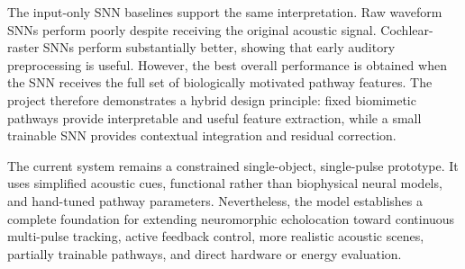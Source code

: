 The input-only SNN baselines support the same interpretation. Raw waveform SNNs perform poorly despite receiving the original acoustic signal. Cochlear-raster SNNs perform substantially better, showing that early auditory preprocessing is useful. However, the best overall performance is obtained when the SNN receives the full set of biologically motivated pathway features. The project therefore demonstrates a hybrid design principle: fixed biomimetic pathways provide interpretable and useful feature extraction, while a small trainable SNN provides contextual integration and residual correction.

The current system remains a constrained single-object, single-pulse prototype. It uses simplified acoustic cues, functional rather than biophysical neural models, and hand-tuned pathway parameters. Nevertheless, the model establishes a complete foundation for extending neuromorphic echolocation toward continuous multi-pulse tracking, active feedback control, more realistic acoustic scenes, partially trainable pathways, and direct hardware or energy evaluation.
